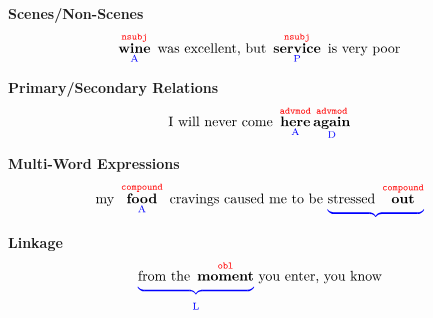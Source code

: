 \documentclass[extrafontsizes,60pt,twocolumn]{memoir}
\DeclareMathOperator*{\wine}{\textbf{wine}}
\DeclareMathOperator*{\service}{\textbf{service}}
\DeclareMathOperator*{\here}{\textbf{here}}
\DeclareMathOperator*{\again}{\textbf{again}}
\DeclareMathOperator*{\food}{\textbf{food}}
\DeclareMathOperator*{\out}{\textbf{out}}
\DeclareMathOperator*{\moment}{\textbf{moment}}
\begin{document}
\vspace{-.9in}

\begin{minipage}{.5\columnwidth}
\textbf{\color{orange}Scenes/Non-Scenes
}\[
\wine_\text{\color{blue}A}^{\texttt{\color{red}nsubj}}\text{ was excellent, but }
\service_\text{\color{blue}P}^{\texttt{\color{red}nsubj}}\text{ is very poor}
\]

\textbf{\color{purple}Primary/Secondary Relations
}\[
\text{I will never come }
\here_\text{\color{blue}A}^{\texttt{\color{red}advmod}}
\again_\text{\color{blue}D}^{\texttt{\color{red}advmod}}
\]
\end{minipage}
\begin{minipage}{.5\columnwidth}
\textbf{\color{olive}Multi-Word Expressions
}\[
\text{my }\food_\text{\color{blue}A}^{\texttt{\color{red}compound}}
\text{ cravings caused me to be }
{\color{blue}\underbrace{\strut\color{black}\text{stressed }\out^{\texttt{\color{red}compound}}}}
\]

\textbf{\color{teal}Linkage}
\[
{\color{blue}\underbrace{\strut\color{black}\text{from the }\moment^{\texttt{\color{red}obl}}}_\text{\strut\color{blue}L}}
\text{ you enter, you know}
\]
\end{minipage}
\end{document}
